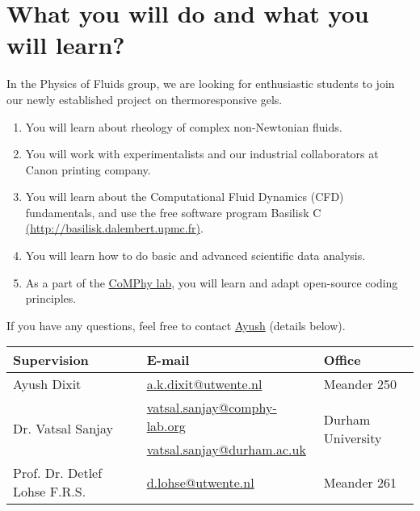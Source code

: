 \documentclass[a4paper,10pt]{article}
\begin{document}
\section*{What you will do and what you will learn?}
In the Physics of Fluids group, we are looking for enthusiastic students to join our newly established project on thermoresponsive gels. 
\begin{enumerate}
	\item You will learn about rheology of complex non-Newtonian fluids. 
	\item You will work with experimentalists and our industrial collaborators at Canon printing company.
	\item You will learn about the Computational Fluid Dynamics (CFD) fundamentals, and use the free software program Basilisk C \href{http://basilisk.dalembert.upmc.fr}{(http://basilisk.dalembert.upmc.fr)}. 
	\item You will learn how to do basic and advanced scientific data analysis. 
	\item As a part of the \href{https://comphy-lab.org}{CoMPhy lab}, you will learn and adapt open-source coding principles. 
\end{enumerate}

If you have any questions, feel free to contact \href{mailto:a.k.dixit@utwente.nl}{Ayush} (details below).
\begin{center}
\begin{tabular}{|l|l|l|}
\hline \textbf{Supervision} & \textbf{E-mail} & \textbf{Office} \\
\hline Ayush Dixit & \href{mailto:a.k.dixit@utwente.nl}{a.k.dixit@utwente.nl} & Meander 250 \\
\hline \multirow{2}{*}{Dr. Vatsal Sanjay} & \href{mailto:vatsal.sanjay@comphy-lab.org}{vatsal.sanjay@comphy-lab.org} & \multirow{2}{*}{Durham University} \\
& \href{mailto:vatsal.sanjay@durham.ac.uk}{vatsal.sanjay@durham.ac.uk} & \\
\hline Prof. Dr. Detlef Lohse F.R.S. & \href{mailto:d.lohse@utwente.nl}{d.lohse@utwente.nl} & Meander 261  \\
\hline
\end{tabular}
\end{center}
\end{document}
